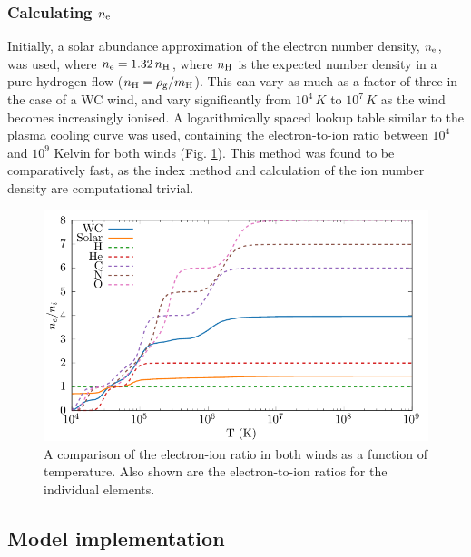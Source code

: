 \subsubsection{Calculating $n_\text{e}$}

Initially, a solar abundance approximation of the electron number density, $n_\text{e}$, was used, where $n_\text{e} = 1.32 \, n_\text{H}$, where $n_\text{H}$ is the expected number density in a pure hydrogen flow ($n_\text{H} = \rho_\text{g} / m_\text{H}$).
This can vary as much as a factor of three in the case of a WC wind, and vary significantly from $10^4 \, \si{K}$ to $10^7 \, \si{K}$ as the wind becomes increasingly ionised.
A logarithmically spaced lookup table similar to the plasma cooling curve was used, containing the electron-to-ion ratio between $10^4$ and $10^9$ Kelvin for both winds (Fig. \ref{fig:electron-curve-no-elements}). 
This method was found to be comparatively fast, as the index method and calculation of the ion number density are computational trivial.

\begin{figure}[h]
  \centering
  \includegraphics{assets/ionisation-fraction/ionisation-fraction.pdf}
  \caption[OB and WR electron-ion ratios]{A comparison of the electron-ion ratio in both winds as a function of temperature. Also shown are the electron-to-ion ratios for the individual elements.}
  \label{fig:electron-curve-no-elements}
\end{figure}

\subsection{Model implementation}
\label{sec:cooling-implementation}

